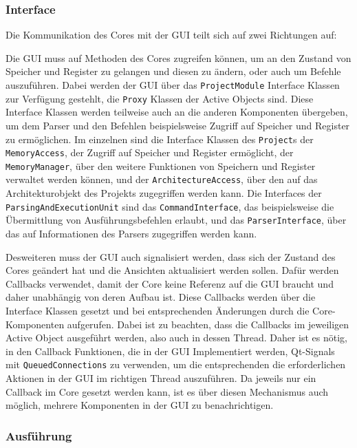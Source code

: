 \subsubsection{Interface}

Die Kommunikation des Cores mit der GUI teilt sich auf zwei Richtungen auf:

Die GUI muss auf Methoden des Cores zugreifen können, um an den Zustand von Speicher und Register zu gelangen und diesen zu ändern, oder auch um Befehle auszuführen. Dabei werden der GUI über das \texttt{ProjectModule} Interface Klassen zur Verfügung gestehlt, die \texttt{Proxy} Klassen der Active Objects sind. Diese Interface Klassen werden teilweise auch an die anderen Komponenten übergeben, um dem Parser und den Befehlen beispielsweise Zugriff auf Speicher und Register zu ermöglichen.
Im einzelnen sind die Interface Klassen des \texttt{Project}s der \texttt{MemoryAccess}, der Zugriff auf Speicher und Register ermöglicht, der \texttt{MemoryManager}, über den weitere Funktionen von Speichern und Register verwaltet werden können, und der \texttt{ArchitectureAccess}, über den auf das Architekturobjekt des Projekts zugegriffen werden kann.
Die Interfaces der \texttt{ParsingAndExecutionUnit} sind das \texttt{CommandInterface}, das beispielsweise die Übermittlung von Ausführungsbefehlen erlaubt, und das \texttt{ParserInterface}, über das auf Informationen des Parsers zugegriffen werden kann.

Desweiteren muss der GUI auch signalisiert werden, dass sich der Zustand des Cores geändert hat und die Ansichten aktualisiert werden sollen. Dafür werden Callbacks verwendet, damit der Core keine Referenz auf die GUI braucht und daher unabhängig von deren Aufbau ist. Diese Callbacks werden über die Interface Klassen gesetzt und bei entsprechenden Änderungen durch die Core-Komponenten aufgerufen. Dabei ist zu beachten, dass die Callbacks im jeweiligen Active Object ausgeführt werden, also auch in dessen Thread. Daher ist es nötig, in den Callback Funktionen, die in der GUI Implementiert werden, Qt-Signals mit \texttt{QueuedConnections} zu verwenden, um die entsprechenden die erforderlichen Aktionen in der GUI im richtigen Thread auszuführen. Da jeweils nur ein Callback im Core gesetzt werden kann, ist es über diesen Mechanismus auch möglich, mehrere Komponenten in der GUI zu benachrichtigen.

\subsubsection{Ausführung}

